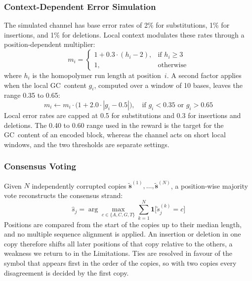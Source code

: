 \documentclass[entropy,article,submit,moreauthors]{Definitions/mdpi}
\begin{document}
\subsubsection{Context-Dependent Error Simulation}

The simulated channel has base error rates of 2\% for substitutions, 1\% for insertions, and 1\% for deletions. Local context modulates these rates through a position-dependent multiplier:
\begin{equation}
    m_i = \begin{cases}
    1 + 0.3 \cdot (h_i - 2), & \text{if } h_i \geq 3 \\
    1, & \text{otherwise}
    \end{cases}
    \label{eq:homo_mult}
\end{equation}
where $h_i$ is the homopolymer run length at position~$i$. A second factor applies when the local GC~content $g_i$, computed over a window of 10 bases, leaves the range 0.35 to 0.65:
\begin{equation}
    m_i \leftarrow m_i \cdot \bigl(1 + 2.0 \cdot |g_i - 0.5|\bigr),
    \quad \text{if } g_i < 0.35 \text{ or } g_i > 0.65
    \label{eq:gc_mult}
\end{equation}
Local error rates are capped at 0.5 for substitutions and 0.3 for insertions and deletions. The 0.40 to 0.60 range used in the reward is the target for the GC~content of an encoded block, whereas the channel acts on short local windows, and the two thresholds are separate settings.

\subsubsection{Consensus Voting}

Given $N$ independently corrupted copies $\tilde{\mathbf{s}}^{(1)}, \ldots, \tilde{\mathbf{s}}^{(N)}$, a position-wise majority vote reconstructs the consensus strand:
\begin{equation}
    \hat{s}_j = \arg\max_{c \in \{A,C,G,T\}}
    \sum_{k=1}^{N} \mathbf{1}\bigl[\tilde{s}_j^{(k)} = c\bigr]
    \label{eq:consensus}
\end{equation}
Positions are compared from the start of the copies up to their median length, and no multiple sequence alignment is applied. An insertion or deletion in one copy therefore shifts all later positions of that copy relative to the others, a weakness we return to in the Limitations. Ties are resolved in favour of the symbol that appears first in the order of the copies, so with two copies every disagreement is decided by the first copy.
\end{document}

